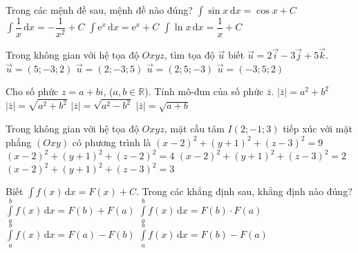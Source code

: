 \begin{ex}%
Trong các mệnh đề sau, mệnh đề nào đúng?
\choice 
{$\displaystyle\int\limits \sin{x} \mathrm{\,d}x=\cos{x}+C$}
{$\displaystyle\int\limits \dfrac{1}{x} \mathrm{\,d}x=-\dfrac{1}{x^2}+C$}
{\True $\displaystyle\int\limits \mathrm{e}^x \mathrm{\,d}x=\mathrm{e}^x+C$}
{$\displaystyle\int\limits \ln{x} \mathrm{\,d}x=\dfrac{1}{x}+C$}
\end{ex}
\begin{ex}%
Trong không gian với hệ tọa độ $Oxyz$, tìm tọa độ $\vec{u}$ biết $\vec{u}=2\vec{i}-3\vec{j}+5\vec{k}$.
\choice 
{$\vec{u}=(5;-3;2)$}
{\True $\vec{u}=(2;-3;5)$}
{$\vec{u}=(2;5;-3)$}
{$\vec{u}=(-3;5;2)$}
\end{ex}
\begin{ex}%
Cho số phức $z=a+bi$, ($a,b \in \mathbb{R}$). Tính mô-đun của số phức $\bar{z}$.
\choice 
{$|\bar{z}|=a^2+b^2$}
{\True $|\bar{z}|=\sqrt{a^2+b^2}$}
{$|\bar{z}|=\sqrt{a^2-b^2}$}
{$|\bar{z}|=\sqrt{a+b}$}
\end{ex}
\begin{ex}%
Trong không gian với hệ tọa độ $Oxyz$, mặt cầu tâm $I(2;-1;3)$ tiếp xúc với mặt phẳng $(Oxy)$ có phương trình là
\choice 
{\True $(x-2)^2+(y+1)^2+(z-3)^2=9$}
{$(x-2)^2+(y+1)^2+(z-2)^2=4$}
{$(x-2)^2+(y+1)^2+(z-3)^2=2$}
{$(x-2)^2+(y+1)^2+(z-3)^2=3$}

\end{ex}

\begin{ex}%
Biết $\displaystyle\int\limits f(x) \mathrm{\,d}x=F(x)+C$. Trong các khẳng định sau, khẳng định nào đúng?
\choice 
{$\displaystyle\int\limits_a^b f(x)\mathrm{\,d}x=F(b)+F(a)$}
{$\displaystyle\int\limits_a^b f(x)\mathrm{\,d}x=F(b)\cdot F(a)$}
{$\displaystyle\int\limits_a^b f(x)\mathrm{\,d}x=F(a)-F(b)$}
{\True $\displaystyle\int\limits_a^b f(x)\mathrm{\,d}x=F(b)-F(a)$}
\end{ex}

